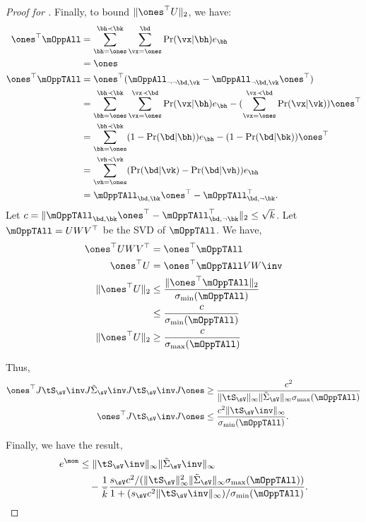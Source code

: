 \begin{proof}[Proof for ]
  Finally, to bound $\|\ones^\top U\|_2$, we have:
  \begin{align*}
    \ones^\top \mOppAll 
      &= \sum_{\bh = \ones}^{\bh \prec \bk} \sum_{\vx = \ones}^{\bd} \Pr(\vx | \bh) e_\bh  \\
      &= \ones \\
    \ones^\top \mOppTAll 
        &= \ones^\top (\mOppAll_{\neg \neg \bd, \vk} - \mOppAll_{\neg \bd, \vk}\ones^\top) \\
        &= \sum_{\bh = \ones}^{\bh \prec \bk} \sum_{\vx = \ones}^{\vx \prec \bd} \Pr(\vx | \bh) e_\bh - (\sum_{\vx = \ones}^{\vx \prec \bd} \Pr(\vx | \vk)) \ones^\top  \\
        &= \sum_{\bh = \ones}^{\bh \prec \bk} (1 - \Pr(\bd | \bh)) e_\bh - (1 - \Pr(\bd | \bk)) \ones^\top  \\
        &= \sum_{\vh = \ones}^{\vh \prec \vk} (\Pr(\bd | \vk) - \Pr(\bd | \vh))e_\bh \\
        &= \mOppTAll_{\bd,\bk} \ones^\top - \mOppTAll_{\bd,\neg \bk}^\top.
  \end{align*}
  Let $c = \|\mOppTAll_{\bd,\bk} \ones^\top - \mOppTAll_{\bd,\neg
  \bk}^\top\|_2 \le \sqrt{k}$.
  Let $\mOppTAll = U W V^\top$ be the SVD of $\mOppTAll$. We have,
  \begin{align*}
    \ones^\top U W V^\top 
        &= \ones^\top \mOppTAll \\
    \ones^\top U 
      &= \ones^\top \mOppTAll V W\inv \\
    \|\ones^\top U\|_2 
        &\le \frac{\|\ones^\top \mOppTAll\|_2}{\sigma_{\min}(\mOppTAll)} \\
        &\le \frac{c}{\sigma_{\min}(\mOppTAll)} \\
    \|\ones^\top U\|_2 
        &\ge \frac{c}{\sigma_{\max}(\mOppTAll)} \\
  \end{align*}

  Thus,
  \begin{align*}
      \ones^\top J \tS_\sV\inv J \tilde\Sigma_\sV\inv J \tS_\sV\inv J \ones 
      &\ge \frac
          {c^2}
          { \|\tS_\sV\|_{\infty} \|\tilde\Sigma_\sV\|_{\infty}
          \sigma_{\max}(\mOppTAll)} \\
      \ones^\top J \tS_\sV\inv J \ones  
      &\le \frac
          {c^2 \|\tS_\sV\inv\|_{\infty}}
          {\sigma_{\min}(\mOppTAll)}.
  \end{align*}

  Finally, we have the result,
  \begin{align*}
    e^\mom 
    &\le \|\tS_\sV\inv\|_\infty  \|\tilde\Sigma_\sV\inv\|_\infty \\
    &\quad - 
        \frac{1}{\bar k} 
    \frac{
        s_\sV c^2 /(\|\tS_\sV\|^2_{\infty} \|\tilde\Sigma_\sV\|_{\infty}
            \sigma_{\max}(\mOppTAll))
    }
    {1 + (s_\sV c^2 \|\tS_\sV\inv\|_{\infty})/
          \sigma_{\min}(\mOppTAll)
    }.
  \end{align*}


\end{proof}
